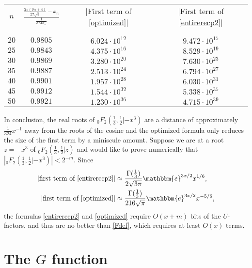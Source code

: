 \documentclass[12pt]{article}
\newcommand{\ee}[0] {\mathbbm{e}}
\numberwithin{equation}{section}
\newcommand{\FFf}[5] {{}_{#1}{#2}_{#3} \left(#4 | {#5} \right)}
\begin{document}
\begin{center}
\begin{tabular}{c|ccc}
$n$ & $\frac{\frac{2\pi(9n+4)}{27 \sqrt{3}} - x_n}{\frac{1}{324 x_n}}$ & $|$First term of \eqref{optimized}$|$ & $|$First term of \eqref{entirerecp2}$|$ \\[-2.0ex] \\ \hline \\ [-2ex]
 $20$ & $0.9805$ & $6.024\cdot10^{12}$ & $9.472\cdot10^{15}$ \\
 $25$ & $0.9843$ & $4.375\cdot10^{16}$ & $8.529\cdot10^{19}$ \\
 $30$ & $0.9869$ & $3.280\cdot10^{20}$ & $7.630\cdot10^{23}$ \\
 $35$ & $0.9887$ & $2.513\cdot10^{24}$ & $6.794\cdot10^{27}$ \\
 $40$ & $0.9901$ & $1.957\cdot10^{28}$ & $6.030\cdot10^{31}$ \\
 $45$ & $0.9912$ & $1.544\cdot10^{32}$ & $5.338\cdot10^{35}$ \\
 $50$ & $0.9921$ & $1.230\cdot10^{36}$ & $4.715\cdot10^{39}$
\end{tabular}
\end{center}
In conclusion, the real roots of $\FFf{0}{F}{2}{\tfrac{1}{3},\tfrac{1}{2}}{-x^3}$ are a distance of approximately $\tfrac{1}{324} x^{-1}$ away from the roots of the cosine and the optimized formula only reduces the size of the first term by a miniscule amount. Suppose we are at a root $z=-x^3$ of $\FFf{0}{F}{2}{\tfrac{1}{3},\tfrac{1}{2}}{z}$ and would like to prove numerically that $|\FFf{0}{F}{2}{\tfrac{1}{3},\tfrac{1}{2}}{-x^3}|<2^{-m}$. Since
\begin{align*}
|\text{first term of \eqref{entirerecp2}}| &\approx \frac{\Gamma(\tfrac13)}{2 \sqrt{3 \pi}} \ee^{3x/2} x^{1/6}\text{,}\\
|\text{first term of \eqref{optimized}}| &\approx \frac{\Gamma(\tfrac13)}{216 \sqrt{\pi}} \ee^{3x/2} x^{-5/6}\text{,}
\end{align*}
the formulas \eqref{entirerecp2} and \eqref{optimized} require $O(x+m)$ bits of the $U$-factors, and thus are no better than \eqref{Fdef}, which requires at least $O(x)$ terms.

\section{The $G$ function}
\end{document}
